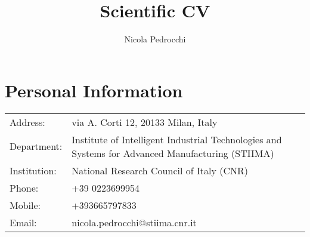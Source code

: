 \documentclass[a4paper,9pt]{extarticle}
\title{Scientific CV}
\author{Nicola Pedrocchi}
\date{ }
\begin{document}
\maketitle

\setlength{\parindent}{0pt}

\section*{Personal Information}
\begin{tabularx}{\textwidth}{lX}
\\Address: &	via A. Corti 12, 20133 Milan, Italy
\\Department: & 	Institute of Intelligent Industrial Technologies and Systems for Advanced Manufacturing (STIIMA)
\\Institution: &  	National Research Council of Italy (CNR)
\\Phone: &  	+39 0223699954
\\Mobile: & 	+393665797833
\\Email: &  	nicola.pedrocchi@stiima.cnr.it
\end{tabularx}
\end{document}

